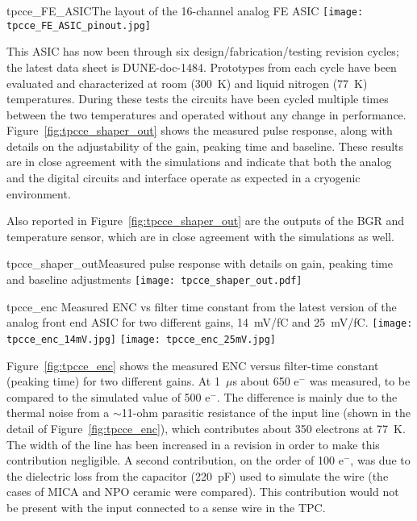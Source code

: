 \begin{cdrfigure}{tpcce_FE_ASIC}{The layout of the 16-channel analog FE ASIC}
\texttt{[image: tpcce\_FE\_ASIC\_pinout.jpg]}
\end{cdrfigure}

This ASIC has now been through six design/fabrication/testing revision cycles; the latest data sheet is DUNE-doc-1484.
Prototypes from each cycle have been evaluated and characterized at room (300~K) and liquid nitrogen (77~K) temperatures.
During these tests the circuits have been cycled multiple times
between the two temperatures and operated without any change in performance.
Figure~\ref{fig:tpcce_shaper_out} shows the measured pulse response, along with
details on the adjustability of the gain, peaking time and baseline.
These results are in close agreement with the simulations and indicate
that both the analog and the digital circuits and interface operate as
expected in a cryogenic environment.

Also reported in Figure~\ref{fig:tpcce_shaper_out} are the outputs of the BGR and temperature sensor,
which are in close agreement with the simulations as well.

\begin{cdrfigure}{tpcce_shaper_out}{Measured pulse response with details on gain, peaking time and baseline adjustments}
\texttt{[image: tpcce\_shaper\_out.pdf]}
\end{cdrfigure}

\begin{cdrfigure}{tpcce_enc}{
Measured ENC vs filter time constant from the latest version of the analog front end ASIC
for two different gains, 14~mV/fC and 25~mV/fC.}
\texttt{[image: tpcce\_enc\_14mV.jpg]}
\texttt{[image: tpcce\_enc\_25mV.jpg]}
\end{cdrfigure}

Figure~\ref{fig:tpcce_enc} shows the measured ENC versus filter-time constant (peaking time) for two different gains.
At 1~$\mu$s about 650 e$^{-}$ was measured, to be compared to the simulated value of 500 e$^{-}$.
The difference is mainly due to the thermal noise from a $\sim$11-ohm parasitic resistance of the input
line (shown in the detail of Figure~\ref{fig:tpcce_enc}), which contributes about 350 electrons at 77~K.
The width of the line has been increased in a revision in order to make this contribution negligible.
A second contribution, on the order of 100 e$^{-}$,
was due to the dielectric loss from the capacitor (220~pF) used to simulate the wire
(the cases of MICA and NPO ceramic were compared).
This contribution would not be present with the input connected to a sense wire in the TPC.

